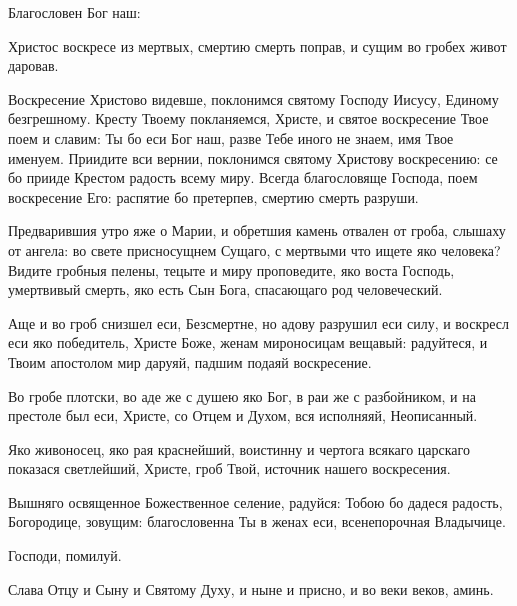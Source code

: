 \begin{mymulticols}


 Благословен Бог наш:

 \MolitvamiSviatyhOtecNashih

Христос воскресе из мертвых, смертию смерть поправ, и сущим во гробех живот даровав.  

Воскресение Христово видевше, поклонимся святому Господу Иисусу, Единому безгрешному. Кресту Твоему покланяемся, Христе, и святое воскресение Твое поем и славим: Ты бо еси Бог наш, разве Тебе иного не знаем, имя Твое именуем. Приидите вси вернии, поклонимся святому Христову воскресению: се бо прииде Крестом радость всему миру. Всегда благословяще Господа, поем воскресение Его: распятие бо претерпев, смертию смерть разруши.  


Предварившия утро яже о Марии, и обретшия камень отвален от гроба, слышаху от ангела: во свете присносущнем Сущаго, с мертвыми что ищете яко человека? Видите гробныя пелены, тецыте и миру проповедите, яко воста Господь, умертвивый смерть, яко есть Сын Бога, спасающаго род человеческий. 


Аще и во гроб снизшел еси, Безсмертне, но адову разрушил еси силу, и воскресл еси яко победитель, Христе Боже, женам мироносицам вещавый: радуйтеся, и Твоим апостолом мир даруяй, падшим подаяй воскресение. 


Во гробе плотски, во аде же с душею яко Бог, в раи же с разбойником, и на престоле был еси, Христе, со Отцем и Духом, вся исполняяй, Неописанный. 

\slava

Яко живоносец, яко рая краснейший, воистинну и чертога всякаго царскаго показася светлейший, Христе, гроб Твой, источник нашего воскресения. 

\inyne

Вышняго освященное Божественное селение, радуйся: Тобою бо дадеся радость, Богородице, зовущим: благословенна Ты в женах еси, всенепорочная Владычице. 

Господи, помилуй.  

Слава Отцу и Сыну и Святому Духу, и ныне и присно, и во веки веков, аминь. 


\end{mymulticols}
